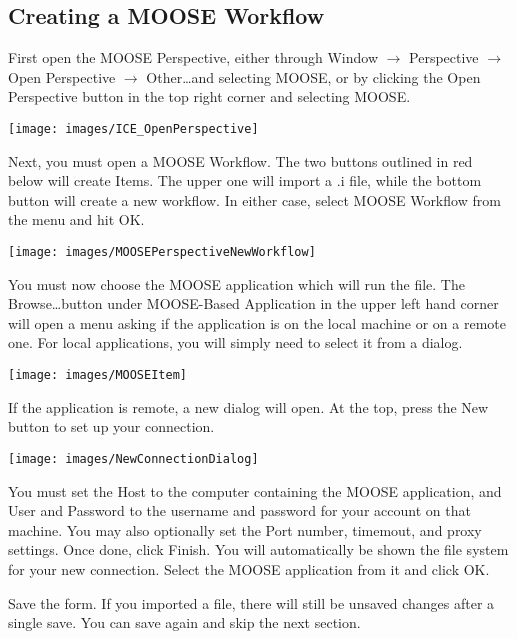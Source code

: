 \subsection{Creating a MOOSE Workflow}

First open the MOOSE Perspective, either through Window $\rightarrow$
Perspective $\rightarrow$ Open Perspective $\rightarrow$ Other\ldots and
selecting MOOSE, or by clicking the Open Perspective button in the top right
corner and selecting MOOSE.

\begin{center}
\texttt{[image: images/ICE\_OpenPerspective]}
\end{center}

Next, you must open a MOOSE Workflow. The two buttons outlined in red below will
create Items. The upper one will import a .i file, while the bottom button will
create a new workflow. In either case, select MOOSE Workflow from the menu and
hit OK.

\begin{center}
\texttt{[image: images/MOOSEPerspectiveNewWorkflow]}
\end{center}

You must now choose the MOOSE application which will run the file. The
Browse\ldots button under MOOSE-Based Application in the upper left hand corner
will open a menu asking if the application is on the local machine or on a
remote one. For local applications, you will simply need to select it from a
dialog. 

\begin{center}
\texttt{[image: images/MOOSEItem]}
\end{center}

If the application is remote, a new dialog will open. At the top, press the New
button to set up your connection. 

\begin{center}
\texttt{[image: images/NewConnectionDialog]}
\end{center}

You must set the Host to the computer containing the MOOSE application, and User
and Password to the username and password for your account on that machine. You
may also optionally set the Port number, timemout, and proxy settings. Once
done, click Finish. You will automatically be shown the file system for your new
connection. Select the MOOSE application from it and click OK.

Save the form. If you imported a file, there will still be unsaved changes after
a single save. You can save again and skip the next section. 

